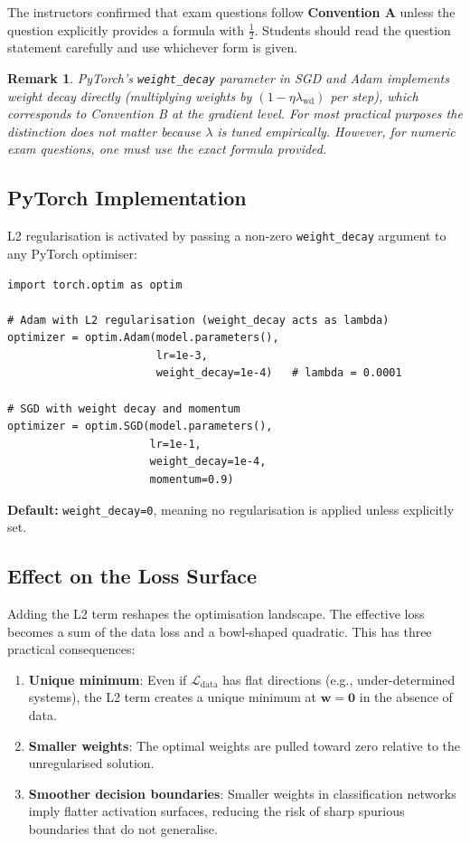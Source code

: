 \documentclass[12pt,a4paper]{article}
\newtheorem{remark}{Remark}[section]
\newcommand{\Ldata}{\mathcal{L}_{\mathrm{data}}}
\begin{document}
\noindent
The instructors confirmed that exam questions follow \textbf{Convention A}
unless the question explicitly provides a formula with $\tfrac{1}{2}$.
Students should read the question statement carefully and use whichever form
is given.

\begin{remark}
\label{rem:pytorch_convention}
PyTorch's \texttt{weight\_decay} parameter in SGD and Adam implements
\emph{weight decay} directly (multiplying weights by $(1-\eta\lambda_{\mathrm{wd}})$
per step), which corresponds to Convention B at the gradient level. For most
practical purposes the distinction does not matter because $\lambda$ is
tuned empirically. However, for numeric exam questions, one must use the
exact formula provided.
\end{remark}

\subsection{PyTorch Implementation}

L2 regularisation is activated by passing a non-zero \texttt{weight\_decay}
argument to any PyTorch optimiser:

\begin{verbatim}
import torch.optim as optim

# Adam with L2 regularisation (weight_decay acts as lambda)
optimizer = optim.Adam(model.parameters(),
                       lr=1e-3,
                       weight_decay=1e-4)   # lambda = 0.0001

# SGD with weight decay and momentum
optimizer = optim.SGD(model.parameters(),
                      lr=1e-1,
                      weight_decay=1e-4,
                      momentum=0.9)
\end{verbatim}

\noindent
\textbf{Default:} \texttt{weight\_decay=0}, meaning no regularisation is
applied unless explicitly set.

\subsection{Effect on the Loss Surface}

Adding the L2 term reshapes the optimisation landscape. The effective loss
becomes a sum of the data loss and a bowl-shaped quadratic. This has three
practical consequences:

\begin{enumerate}[label=\textbf{(\roman*)}]
  \item \textbf{Unique minimum}: Even if $\Ldata$ has flat directions (e.g.,
        under-determined systems), the L2 term creates a unique minimum at
        $\mathbf{w} = \mathbf{0}$ in the absence of data.
  \item \textbf{Smaller weights}: The optimal weights are pulled toward zero
        relative to the unregularised solution.
  \item \textbf{Smoother decision boundaries}: Smaller weights in
        classification networks imply flatter activation surfaces, reducing
        the risk of sharp spurious boundaries that do not generalise.
\end{enumerate}
\end{document}
